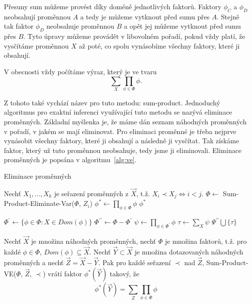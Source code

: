 Přesuny sum můžeme provést díky doméně jednotlivých faktorů.
Faktory $\phi_C$ a $\phi_D$ neobsahují proměnnou $A$ a tedy je můžeme vytknout před sumu přes $A$.
Stejně tak faktor $\phi_D$ neobsahuje proměnnou $B$ a opět jej můžeme vytknout před sumu přes $B$.
Tyto úpravy můžeme provádět v libovolném pořadí, pokud vždy platí, že vysčítáme proměnnou $X$ až poté, co spolu vynásobíme všechny faktory, které ji obsahují.

V obecnosti vždy počítáme výraz, který je ve tvaru
\[
\sum_X \prod_{\phi \in \Phi} \phi.
\]

Z tohoto také vychází název pro tuto metodu: sum-product.
Jednoduchý algoritmus pro exaktní inferenci využívající tuto metodu se nazývá eliminace proměnných.
Základní myšlenka je, že máme dán seznam náhodných proměnných v pořadí, v jakém se mají eliminovat.
Pro eliminaci proměnné je třeba nejprve vynásobit všechny faktory, které ji obsahují a následně ji vysčítat.
Tak získáme faktor, který už tuto proměnnou neobsahuje, tedy jsme ji eliminovali.
Eliminace proměnných je popsána v algoritmu~\ref{alg:ve}.

\begin{algorithm}[H]
\caption{Eliminace proměnných}
\label{alg:ve}
\begin{algorithmic}
\State

\State Nechť $X_1, \dots, X_k$ je seřazení proměnných z $\vec{X}$, t.ž. $X_i \prec X_j \Leftrightarrow i < j$.
	\State $\Phi \gets$ Sum-Product-Eliminate-Var($\Phi$, $Z_i$)
\EndFor
\State $\phi^* \gets \prod_{\phi \in \Phi} \phi$
\State \Return $\phi^*$
\EndFunction
\State
{}
\State

\State $\Phi^\prime \gets \{\phi \in \Phi: X \in Dom(\phi)\}$
\State $\Phi^{\prime \prime} \gets \Phi - \Phi^\prime$
\State $\psi \gets \prod_{\phi \in \Phi^\prime} \phi$
\State $\tau \gets \sum_X \psi$
\State \Return $\Psi^{\prime\prime} \bigcup \{\tau\}$
\EndFunction
\end{algorithmic}
\end{algorithm}

\begin{theorem}
Nechť $\vec{X}$ je množina náhodných proměnných, nechť $\Phi$ je množina faktorů, t.ž. pro každé $\phi \in \Phi$, $Dom(\phi) \subseteq \vec{X}$.
Nechť $\vec{Y} \subset \vec{X}$ je množina dotazovaných náhodných proměnných a nechť $\vec{Z} = \vec{X} - \vec{Y}$.
Pak pro každé seřazení $\prec$ nad $\vec{Z}$, Sum-Product-VE($\Phi$, $\vec{Z}$, $\prec$) vrátí faktor $\phi^*(\vec{Y})$ takový, že
\[
\phi^*(\vec{Y}) = \sum_Z \prod_{\phi \in \Phi} \phi
\]
\end{theorem}


